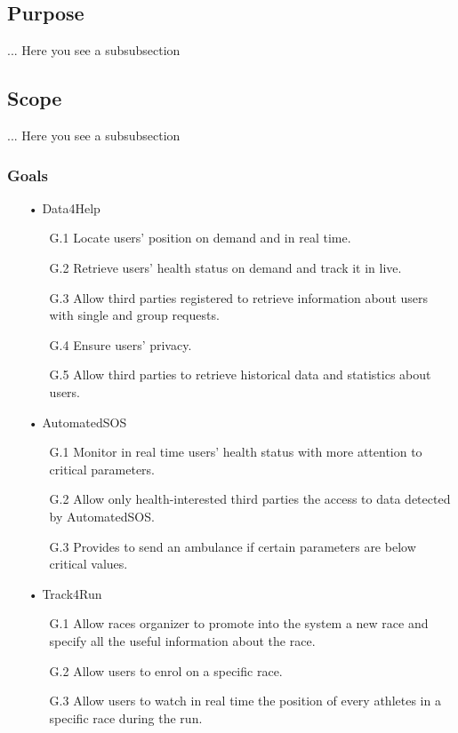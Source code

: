 \subsection{Purpose}
... Here you see a subsubsection
\subsection{Scope}
... Here you see a subsubsection
\subsubsection{Goals}

\begin{enumerate}
\item[•] {\Large Data4Help}
	\begin{enumerate}
		\item [G.1] Locate users' position on demand and in real time.
		\item [G.2] Retrieve users’ health status on demand and track it in live.
		\item [G.3] Allow third parties registered to retrieve information about users with 				single and group requests.
		\item [G.4] Ensure users' privacy.
		\item [G.5] Allow third parties to retrieve historical data and statistics about 				users.
	\end{enumerate}
	
\item[•] {\Large AutomatedSOS}
	\begin{enumerate}
		\item [G.1] Monitor in real time users’ health status with more attention to 					critical parameters.
		\item [G.2] Allow only health-interested third parties the access to data detected 				by AutomatedSOS.
		\item [G.3] Provides to send an ambulance if certain parameters are below critical 				values.
	\end{enumerate}
	
\item[•] {\Large Track4Run}	
	\begin{enumerate}
		\item [G.1] Allow races organizer to promote into the system a new race and specify 			all the useful information about the race.
		\item [G.2] Allow users to enrol on a specific race.
		\item [G.3] Allow users to watch in real time the position of every athletes in a 				specific race during the run.
	\end{enumerate}
\end{enumerate}

